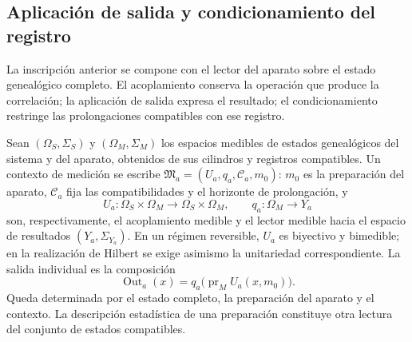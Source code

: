 \subsection{Aplicación de salida y condicionamiento del registro}
\label{vii:sec:salida-condicionamiento}

La inscripción anterior se compone con el lector del aparato sobre el
estado genealógico completo. El acoplamiento conserva la operación que
produce la correlación; la aplicación de salida expresa el resultado; el
condicionamiento restringe las prolongaciones compatibles con ese registro.

Sean \((\Omega_S,\Sigma_S)\) y \((\Omega_M,\Sigma_M)\) los espacios
medibles de estados genealógicos del sistema y del aparato, obtenidos de
sus cilindros y registros compatibles. Un contexto de medición se escribe
\(\mathfrak M_a=(U_a,q_a,\mathcal C_a,m_0)\): \(m_0\) es la
preparación del aparato, \(\mathcal C_a\) fija las compatibilidades y el
horizonte de prolongación, y
\[
 U_a:\Omega_S\times\Omega_M\longrightarrow\Omega_S\times\Omega_M,
 \qquad q_a:\Omega_M\longrightarrow Y_a
\]
son, respectivamente, el acoplamiento medible y el lector medible hacia
el espacio de resultados \((Y_a,\Sigma_{Y_a})\). En un régimen reversible,
\(U_a\) es biyectivo y bimedible; en la realización de Hilbert se exige
asimismo la unitariedad correspondiente. La salida individual es la composición
\begin{equation}
 \operatorname{Out}_a(x)
 =q_a\bigl(\operatorname{pr}_M U_a(x,m_0)\bigr).
 \label{vii:eq:out-genealogico}
\end{equation}
Queda determinada por el estado completo, la preparación del aparato y
el contexto. La descripción estadística de una preparación constituye
otra lectura del conjunto de estados compatibles.

